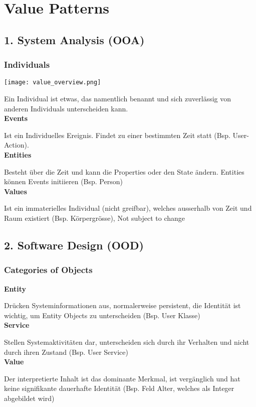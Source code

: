 \section{Value Patterns}
\subsection{1. System Analysis (OOA)}
\subsubsection{Individuals}
\texttt{[image: value\_overview.png]}

Ein Individual ist etwas, das namentlich benannt und sich zuverlässig von anderen
Individuals unterscheiden kann. \\

\textbf{Events}

Ist ein Individuelles Ereignis. Findet zu einer bestimmten Zeit statt (Bsp. User-Action). \\

\textbf{Entities}

Besteht über die Zeit und kann die Properties oder den State ändern. Entities können Events initiieren (Bsp. Person) \\

\textbf{Values}

Ist ein immaterielles Individual (nicht greifbar), welches ausserhalb von Zeit und Raum existiert (Bsp. Körpergrösse), Not subject to change

\subsection{2. Software Design (OOD)}
\subsubsection{Categories of Objects}
\textbf{Entity}

Drücken Systeminformationen aus, normalerweise persistent, die Identität ist wichtig, um Entity Objects zu unterscheiden (Bsp. User Klasse)\\

\textbf{Service}

Stellen Systemaktivitäten dar, unterscheiden sich durch ihr Verhalten und nicht durch ihren Zustand (Bsp. User Service) \\

\textbf{Value}

Der interpretierte Inhalt ist das dominante Merkmal, ist vergänglich und hat keine signifikante dauerhafte Identität (Bsp. Feld Alter, welches als Integer abgebildet wird) \\

